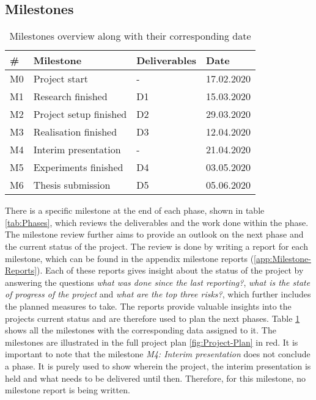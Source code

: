 \subsection{Milestones}
\label{sec:Milestones-Project}
\begin{table}[htb]
    \centering
    \caption{Milestones overview along with their corresponding date}
	\label{tab:Milestones}
    \begin{tabular}{p{} | p{} | p{} | p{}}
        \toprule
        \textbf{\#} & \textbf{Milestone} & \textbf{Deliverables} & \textbf{Date} \\ 
        \midrule[1pt]
        M0 & Project start & - & 17.02.2020\\
        \hline
        M1 & Research finished & D1 & 15.03.2020\\
        \hline
        M2 & Project setup finished & D2 & 29.03.2020\\
        \hline
        M3 & Realisation finished & D3 & 12.04.2020\\
        \hline
        M4 & Interim presentation & - & 21.04.2020\\
        \hline
        M5 & Experiments finished & D4 & 03.05.2020\\
        \hline
        M6 & Thesis submission & D5 & 05.06.2020\\
        \bottomrule
    \end{tabular}
\end{table}
\noindent
There is a specific milestone at the end of each phase, shown in table \ref{tab:Phases}, which reviews the deliverables and the work done within the phase. The milestone review further aims to provide an outlook on the next phase and the current status of the project. The review is done by writing a report for each milestone, which can be found in the appendix milestone reports (\ref{app:Milestone-Reports}). Each of these reports gives insight about the status of the project by answering the questions \textit{what was done since the last reporting?}, \textit{what is the state of progress of the project} and \textit{what are the top three risks?}, which further includes the planned measures to take. The reports provide valuable insights into the projects current status and are therefore used to plan the next phases. Table \ref{tab:Milestones} shows all the milestones with the corresponding data assigned to it. The milestones are illustrated in the full project plan \ref{fig:Project-Plan} in red.
\newline
\newline
It is important to note that the milestone \textit{M4: Interim presentation} does not conclude a phase. It is purely used to show wherein the project, the interim presentation is held and what needs to be delivered until then. Therefore, for this milestone, no milestone report is being written.

